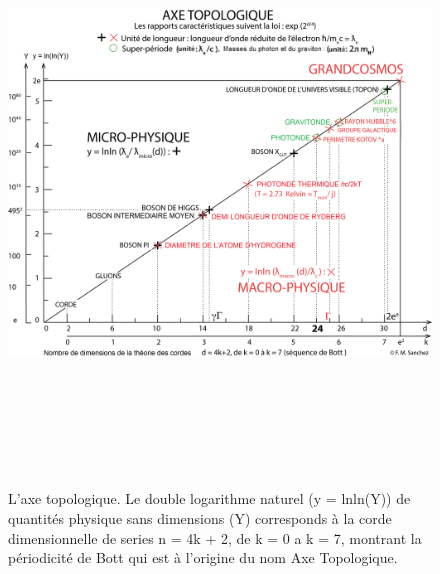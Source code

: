 \documentclass[a4paper,12pt]{article}
\begin{document}
\begin{appendix}
\begin{figure}
\centering
\includegraphics[width=15cm,height=16cm]{./figures/figure.png}
\caption[Axe Topologique]{L'axe topologique. Le double logarithme naturel (y = lnln(Y)) de quantités physique sans dimensions (Y) corresponds à la corde dimensionnelle de series n = 4k + 2, de k = 0 a k = 7, montrant la périodicité de Bott qui est à l'origine du nom Axe Topologique.}
\label{fig:2:figure2}
\end{figure}


\end{appendix}
\end{document}
